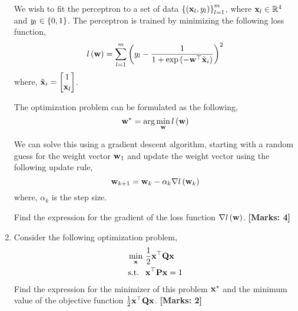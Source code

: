 \documentclass[12pt]{article}
\def\mf{\ensuremath\mathbf}
\def\mb{\ensuremath\mathbb}
\def\lp{\ensuremath\left(}
\def\rp{\ensuremath\right)}
\def\lc{\ensuremath\left\{}
\def\rc{\ensuremath\right\}}
\def\emx{\ensuremath\end{bmatrix*}}
\def\bmxc{\ensuremath\begin{bmatrix*}[c]}
\newcommand{\ct}[1]{\lp #1\rp}
\begin{document}
\begin{enumerate}
\begin{center}
    \end{center}

    We wish to fit the perceptron to a set of data $\lc\lp \mf{x}_l, y_l \rp\rc_{l=1}^{m}$, where $\mf{x}_l \in \mb{R}^4$ and $y_l \in \lc 0, 1\rc$. The perceptron is trained by minimizing the following loss function,
    \[ l\ct{\mf{w}} = \sum_{l=1}^{m} \lp y_l - \frac{1}{1 + \exp\ct{-\mf{w}^\top \tilde{\mf{x}}_i}}\rp^2 \]
    where, $\tilde{\mf{x}}_i = \bmxc 1 \\ \mf{x}_l\emx$.

    The optimization problem can be formulated as the following,
    \[ \mf{w}^* = \arg\min_{\mf{w}} l\ct{\mf{w}} \]

    We can solve this using a gradient descent algorithm, starting with a random guess for the weight vector $\mf{w}_1$ and update the weight vector using the following update rule,
    \[ \mf{w}_{k+1} = \mf{w}_k - \alpha_k \nabla l\ct{\mf{w}_k} \]
    where, $\alpha_k$ is the step size. 
    
    Find the expression for the gradient of the loss function $\nabla l\ct{\mf{w}}$. \textbf{[Marks: 4]}

    \item Consider the following optimization problem,
    \[  \begin{split}
        \min_{\mf{x}} &\,\, \frac{1}{2}\mf{x}^\top\mf{Q}\mf{x} \\
        \text{s.t. } &\,\, \mf{x}^\top\mf{P}\mf{x} = 1
       \end{split} \]
    Find the expression for the minimizer of this problem $\mf{x}^*$ and the minimum value of the objective function $\frac{1}{2}\mf{x}^\top\mf{Q}\mf{x}$. \textbf{[Marks: 2]}
       

\end{enumerate}
\end{document}
